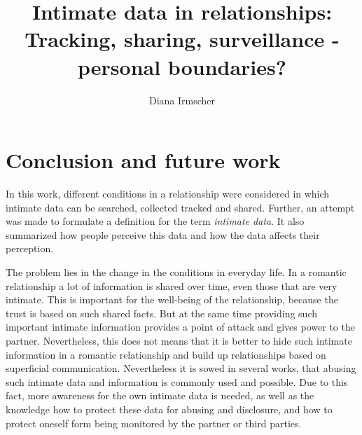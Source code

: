\documentclass[journal]{vgtc}                %
\title{Intimate data in relationships: Tracking, sharing, surveillance - personal boundaries?}
\author{Diana Irmscher}
\begin{document}

\maketitle

%
%












\section{Conclusion and future work}
\label{sec:conculsion}
In this work, different conditions in a relationship  were considered in which intimate data can be searched, collected tracked and shared.
Further, an attempt was made to formulate a definition for the term \textit{intimate data}. It also summarized how people perceive this data and how the data affects their perception.



The problem lies in the change in the conditions in everyday life.
In a romantic relationship a lot of information is shared over time, even those that are very intimate. This is important for the well-being of the relationship, because the trust is based on such shared facts. But at the same time providing such important intimate information provides a point of attack and gives power to the partner. Nevertheless, this does not means that it is better to hide such intimate information in a romantic relationship and build up relationships based on superficial communication.
Nevertheless it is sowed in several works, that abusing such intimate data and information is commonly used and possible. Due to this fact, more awareness for the own intimate data is needed, as well as the knowledge how to protect these data for abusing and disclosure, and how to protect oneself form being monitored by the partner or third parties.





\printbibliography
\end{document}
